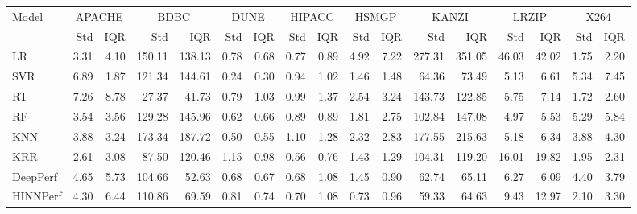 \begin{tabular}{lrrrrrrrrrrrrrrrr}
\toprule
Model & \multicolumn{2}{c}{APACHE} & \multicolumn{2}{c}{BDBC} & \multicolumn{2}{c}{DUNE} & \multicolumn{2}{c}{HIPACC} & \multicolumn{2}{c}{HSMGP} & \multicolumn{2}{c}{KANZI} & \multicolumn{2}{c}{LRZIP} & \multicolumn{2}{c}{X264} \\
 & Std & IQR & Std & IQR & Std & IQR & Std & IQR & Std & IQR & Std & IQR & Std & IQR & Std & IQR \\
\midrule
LR & 3.31 & 4.10 & 150.11 & 138.13 & 0.78 & 0.68 & 0.77 & 0.89 & 4.92 & 7.22 & 277.31 & 351.05 & 46.03 & 42.02 & 1.75 & 2.20 \\
SVR & 6.89 & 1.87 & 121.34 & 144.61 & 0.24 & 0.30 & 0.94 & 1.02 & 1.46 & 1.48 & 64.36 & 73.49 & 5.13 & 6.61 & 5.34 & 7.45 \\
RT & 7.26 & 8.78 & 27.37 & 41.73 & 0.79 & 1.03 & 0.99 & 1.37 & 2.54 & 3.24 & 143.73 & 122.85 & 5.75 & 7.14 & 1.72 & 2.60 \\
RF & 3.54 & 3.56 & 129.28 & 145.96 & 0.62 & 0.66 & 0.89 & 0.89 & 1.81 & 2.75 & 102.84 & 147.08 & 4.97 & 5.53 & 5.29 & 5.84 \\
KNN & 3.88 & 3.24 & 173.34 & 187.72 & 0.50 & 0.55 & 1.10 & 1.28 & 2.32 & 2.83 & 177.55 & 215.63 & 5.18 & 6.34 & 3.88 & 4.30 \\
KRR & 2.61 & 3.08 & 87.50 & 120.46 & 1.15 & 0.98 & 0.56 & 0.76 & 1.43 & 1.29 & 104.31 & 119.20 & 16.01 & 19.82 & 1.95 & 2.31 \\
DeepPerf & 4.65 & 5.73 & 104.66 & 52.63 & 0.68 & 0.67 & 0.68 & 1.08 & 1.45 & 0.90 & 62.74 & 65.11 & 6.27 & 6.09 & 4.40 & 3.79 \\
HINNPerf & 4.30 & 6.44 & 110.86 & 69.59 & 0.81 & 0.74 & 0.70 & 1.08 & 0.73 & 0.96 & 59.33 & 64.63 & 9.43 & 12.97 & 2.10 & 3.30 \\
\bottomrule
\end{tabular}
